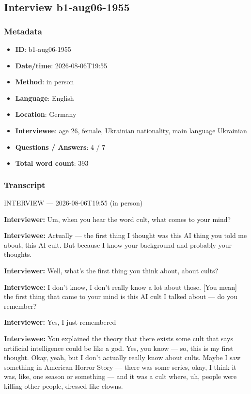 \subsection{Interview b1-aug06-1955}\label{int:b1-aug06-1955}
\subsubsection*{Metadata}
\begin{itemize}
  \item \textbf{ID}: b1-aug06-1955
  \item \textbf{Date/time}: 2026-08-06T19:55
  \item \textbf{Method}: in person
  \item \textbf{Language}: English
  \item \textbf{Location}: Germany
  \item \textbf{Interviewee}: age 26, female, Ukrainian nationality, main language Ukrainian
  \item \textbf{Questions / Answers}: 4 / 7
  \item \textbf{Total word count}: 393
\end{itemize}
\subsubsection*{Transcript}
INTERVIEW — 2026-08-06T19:55 (in person)

\textbf{Interviewer:} Um, when you hear the word cult, what comes to your mind?

\textbf{Interviewee:} Actually — the first thing I thought was this AI thing you told me about, this AI cult. But because I know your background and probably your thoughts.

\textbf{Interviewer:} Well, what's the first thing you think about, about cults?

\textbf{Interviewee:} I don't know, I don't really know a lot about those. [You mean] the first thing that came to your mind is this AI cult I talked about — do you remember?

\textbf{Interviewer:} Yes, I just remembered

\textbf{Interviewee:} You explained the theory that there exists some cult that says artificial intelligence could be like a god. Yes, you know — so, this is my first thought. Okay, yeah, but I don't actually really know about cults. Maybe I saw something in American Horror Story — there was some series, okay, I think it was, like, one season or something — and it was a cult where, uh, people were killing other people, dressed like clowns.


